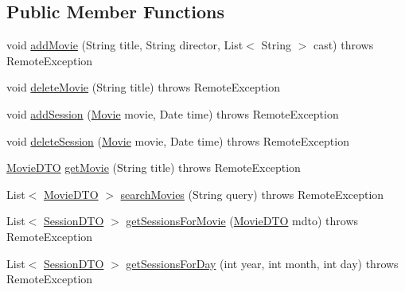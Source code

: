\subsection*{Public Member Functions}
\begin{DoxyCompactItemize}
\item 
void \mbox{\hyperlink{interfacees_1_1deusto_1_1server_1_1_i_server_a393d8689e14b3534dfa425e4c900532e}{add\+Movie}} (String title, String director, List$<$ String $>$ cast)  throws Remote\+Exception
\item 
void \mbox{\hyperlink{interfacees_1_1deusto_1_1server_1_1_i_server_a0b3243dc04d49f7659fefec4e4fb43b7}{delete\+Movie}} (String title)  throws Remote\+Exception
\item 
void \mbox{\hyperlink{interfacees_1_1deusto_1_1server_1_1_i_server_a1e1a4e176284ef7aec05142fb85b9a72}{add\+Session}} (\mbox{\hyperlink{classes_1_1deusto_1_1server_1_1jdo_1_1_movie}{Movie}} movie, Date time)  throws Remote\+Exception
\item 
void \mbox{\hyperlink{interfacees_1_1deusto_1_1server_1_1_i_server_a83edabd700f0b02d4007c28392ec7c94}{delete\+Session}} (\mbox{\hyperlink{classes_1_1deusto_1_1server_1_1jdo_1_1_movie}{Movie}} movie, Date time)  throws Remote\+Exception
\item 
\mbox{\hyperlink{classes_1_1deusto_1_1server_1_1data_1_1_movie_d_t_o}{Movie\+D\+TO}} \mbox{\hyperlink{interfacees_1_1deusto_1_1server_1_1_i_server_a2b7883e416d98a7c92de13cbed7af450}{get\+Movie}} (String title)  throws Remote\+Exception
\item 
List$<$ \mbox{\hyperlink{classes_1_1deusto_1_1server_1_1data_1_1_movie_d_t_o}{Movie\+D\+TO}} $>$ \mbox{\hyperlink{interfacees_1_1deusto_1_1server_1_1_i_server_a50b7dacdeb04d5f1ee3f3b59989ed117}{search\+Movies}} (String query)  throws Remote\+Exception
\item 
List$<$ \mbox{\hyperlink{classes_1_1deusto_1_1server_1_1data_1_1_session_d_t_o}{Session\+D\+TO}} $>$ \mbox{\hyperlink{interfacees_1_1deusto_1_1server_1_1_i_server_a33dc65de2a567be10bf2477ee28765f8}{get\+Sessions\+For\+Movie}} (\mbox{\hyperlink{classes_1_1deusto_1_1server_1_1data_1_1_movie_d_t_o}{Movie\+D\+TO}} mdto)  throws Remote\+Exception
\item 
List$<$ \mbox{\hyperlink{classes_1_1deusto_1_1server_1_1data_1_1_session_d_t_o}{Session\+D\+TO}} $>$ \mbox{\hyperlink{interfacees_1_1deusto_1_1server_1_1_i_server_aac50d6a77e30df4d4c15fcaf4ba979f5}{get\+Sessions\+For\+Day}} (int year, int month, int day)  throws Remote\+Exception
\item 

\end{DoxyCompactItemize}
